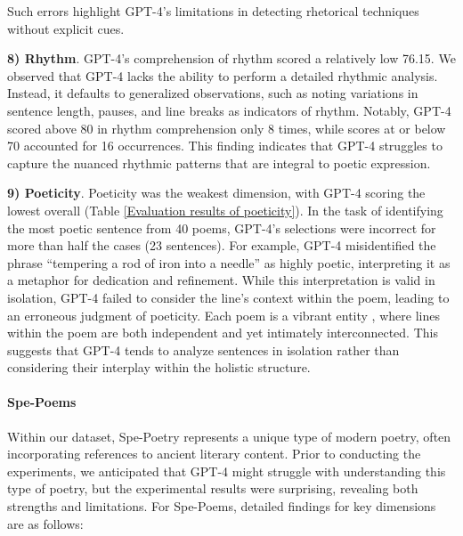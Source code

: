 \documentclass[11pt]{article}
\begin{document}

Such errors highlight GPT-4's limitations in detecting rhetorical techniques without explicit cues.

\textbf{8) Rhythm}. GPT-4's comprehension of rhythm scored a relatively low 76.15. We observed that GPT-4 lacks the ability to perform a detailed rhythmic analysis. Instead, it defaults to generalized observations, such as noting variations in sentence length, pauses, and line breaks as indicators of rhythm. Notably, GPT-4 scored above 80 in rhythm comprehension only 8 times, while scores at or below 70 accounted for 16 occurrences. This finding indicates that GPT-4 struggles to capture the nuanced rhythmic patterns that are integral to poetic expression.

\textbf{9) Poeticity}. Poeticity was the weakest dimension, with GPT-4 scoring the lowest overall (Table \ref{Evaluation results of poeticity}). In the task of identifying the most poetic sentence from 40 poems, GPT-4's selections were incorrect for more than half the cases (23 sentences). For example, GPT-4 misidentified the phrase ``tempering a rod of iron into a needle'' as highly poetic, interpreting it as a metaphor for dedication and refinement. While this interpretation is valid in isolation, GPT-4 failed to consider the line's context within the poem, leading to an erroneous judgment of poeticity. Each poem is a vibrant entity \cite{ZhangTaozhou2021How}, where lines within the poem are both independent and yet intimately interconnected. This suggests that GPT-4 tends to analyze sentences in isolation rather than considering their interplay within the holistic structure.


\paragraph{Spe-Poems}

Within our dataset, Spe-Poetry represents a unique type of modern poetry, often incorporating references to ancient literary content. Prior to conducting the experiments, we anticipated that GPT-4 might struggle with understanding this type of poetry, but the experimental results were surprising, revealing both strengths and limitations. For Spe-Poems, detailed findings for key dimensions are as follows:
\end{document}
